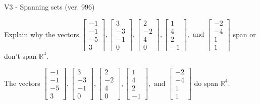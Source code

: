 \begin{exercise}
  \begin{exerciseTitle}V3 - Spanning sets (ver. 996)\end{exerciseTitle}
  \begin{exerciseStatement}
    Explain why the vectors \(\left[\begin{array}{r}
-1 \\
-1 \\
-5 \\
3
\end{array}\right] , \left[\begin{array}{r}
3 \\
-3 \\
-1 \\
0
\end{array}\right] , \left[\begin{array}{r}
2 \\
-2 \\
4 \\
0
\end{array}\right] , \left[\begin{array}{r}
1 \\
4 \\
2 \\
-1
\end{array}\right] , \text{ and } \left[\begin{array}{r}
-2 \\
-4 \\
1 \\
1
\end{array}\right]\) span or don't span \(\mathbb{R}^4\). 
	


  \end{exerciseStatement}
  \begin{exerciseAnswer}
   The vectors \(\left[\begin{array}{r}
-1 \\
-1 \\
-5 \\
3
\end{array}\right] , \left[\begin{array}{r}
3 \\
-3 \\
-1 \\
0
\end{array}\right] , \left[\begin{array}{r}
2 \\
-2 \\
4 \\
0
\end{array}\right] , \left[\begin{array}{r}
1 \\
4 \\
2 \\
-1
\end{array}\right] , \text{ and } \left[\begin{array}{r}
-2 \\
-4 \\
1 \\
1
\end{array}\right]\) 
  	 do  
	span \(\mathbb{R}^4\).
  



\end{exerciseAnswer}
\end{exercise}
